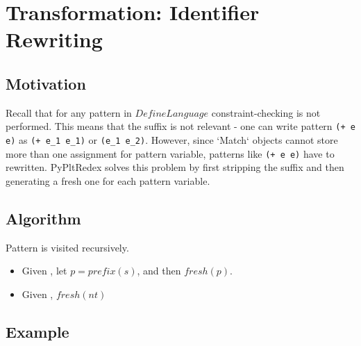 \section{Transformation: Identifier Rewriting}

\subsection{Motivation}

Recall that for any pattern in $DefineLanguage$ constraint-checking is not performed. This means that the suffix is not relevant - one can write pattern \texttt{(+ e e)} as \texttt{(+ e\_1 e\_1)} or \texttt{(e\_1 e\_2)}. However, since `Match` objects cannot store more than one assignment for pattern variable, patterns like \texttt{(+ e e)} have to rewritten. PyPltRedex solves this problem by first stripping the suffix and then generating a fresh one for each pattern variable.

\subsection{Algorithm}
Pattern is visited recursively.

\begin{itemize}
\item Given \BuiltInPattern, let $p=prefix(s)$, and then $fresh(p)$.
\item Given \Nt, $fresh(nt)$
\end{itemize}

\subsection{Example}
